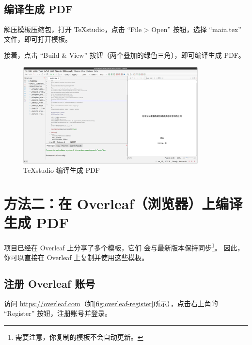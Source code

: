 \subsection{编译生成 PDF}

解压模板压缩包，打开 TeXstudio，点击 ``File > Open'' 按钮，选择 ``main.tex'' 文件，即可打开模板。

接着，点击 ``Build \& View'' 按钮（两个叠加的绿色三角），即可编译生成 PDF。

\begin{figure}[H]
  \begin{center}
    \includegraphics[width=0.85\textwidth]{imgs/texstudio-compile-and-view.png}
  \end{center}
  \caption{TeXstudio 编译生成 PDF}
  \label{fig:texstudio-compile-and-view}
\end{figure}

\clearpage
\section{方法二：在 Overleaf（浏览器）上编译生成 PDF}
\label{sec:overleaf-compile}

\BIThesis 项目已经在 Overleaf 上分享了多个模板，它们
会与最新版本保持同步\footnote{需要注意，你复制的模板不会自动更新。}。
因此，你可以直接在 Overleaf 上复制并使用这些模板。

\subsection{注册 Overleaf 账号}

访问 \url{https://overleaf.com}（如\autoref{fig:overleaf-register}所示），点击右上角的 ``Register'' 按钮，注册账号并登录。

